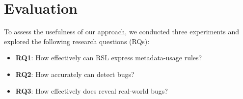 \section{Evaluation}\label{se:evaluation}

To assess the usefulness of our approach, we conducted three experiments and explored the following research questions (RQs):

\begin{itemize}
\item \textbf{RQ1}: How effectively can RSL express metadata-usage rules?
\item \textbf{RQ2}: How accurately can \tool detect bugs?
\item \textbf{RQ3}: How effectively does \tool reveal real-world bugs?
\end{itemize}




%